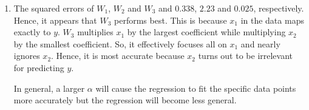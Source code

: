 \documentclass[submit]{harvardml}
\begin{document}
\begin{enumerate}
    \item The squared errors of $W_1$, $W_2$ and $W_3$ and $0.338$, $2.23$ and $0.025$, respectively. Hence, it appears that $W_3$ performs best. This is because $x_1$ in the data maps exactly to $y$. $W_3$ multiplies $x_1$ by the largest coefficient while multiplying $x_2$ by the smallest coefficient. So, it effectively focuses all on $x_1$ and nearly ignores $x_2$. Hence, it is most accurate because $x_2$ turns out to be irrelevant for predicting $y.$
    
    In general, a larger $\alpha$ will cause the regression to fit the specific data points more accurately but the regression will become less general.
\end{enumerate}



\newpage
\end{document}
